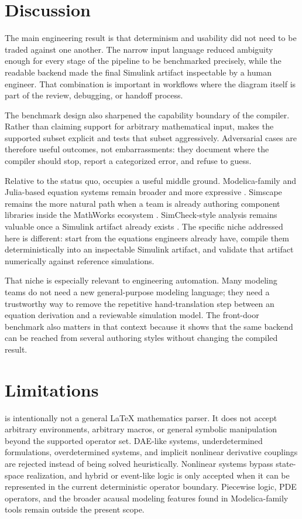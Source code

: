 \documentclass[colorlinks,upint,subscriptcorrection,varvw,balance,nofoot]{asmeconf}
\newcommand{\EqnToSim}{\NoCaseChange{Eqn2Sim}}
\begin{document}
\section{Discussion}
The main engineering result is that determinism and usability did not need to be traded against one another. The narrow input language reduced ambiguity enough for every stage of the pipeline to be benchmarked precisely, while the readable backend made the final Simulink artifact inspectable by a human engineer. That combination is important in workflows where the diagram itself is part of the review, debugging, or handoff process.

The benchmark design also sharpened the capability boundary of the compiler. Rather than claiming support for arbitrary mathematical input, \EqnToSim{} makes the supported subset explicit and tests that subset aggressively. Adversarial cases are therefore useful outcomes, not embarrassments: they document where the compiler should stop, report a categorized error, and refuse to guess.

Relative to the status quo, \EqnToSim{} occupies a useful middle ground. Modelica-family and Julia-based equation systems remain broader and more expressive \cite{fritzson2020openmodelica,ma2021modelingtoolkit,elmqvist2021modia}. Simscape remains the more natural path when a team is already authoring component libraries inside the MathWorks ecosystem \cite{mathworks2026simscape}. SimCheck-style analysis remains valuable once a Simulink artifact already exists \cite{roy2010simcheck}. The specific niche addressed here is different: start from the equations engineers already have, compile them deterministically into an inspectable Simulink artifact, and validate that artifact numerically against reference simulations.

That niche is especially relevant to engineering automation. Many modeling teams do not need a new general-purpose modeling language; they need a trustworthy way to remove the repetitive hand-translation step between an equation derivation and a reviewable simulation model. The front-door benchmark also matters in that context because it shows that the same backend can be reached from several authoring styles without changing the compiled result.

\section{Limitations}
\EqnToSim{} is intentionally not a general \LaTeX{} mathematics parser. It does not accept arbitrary environments, arbitrary macros, or general symbolic manipulation beyond the supported operator set. DAE-like systems, underdetermined formulations, overdetermined systems, and implicit nonlinear derivative couplings are rejected instead of being solved heuristically. Nonlinear systems bypass state-space realization, and hybrid or event-like logic is only accepted when it can be represented in the current deterministic operator boundary. Piecewise logic, PDE operators, and the broader acausal modeling features found in Modelica-family tools remain outside the present scope.
\end{document}
